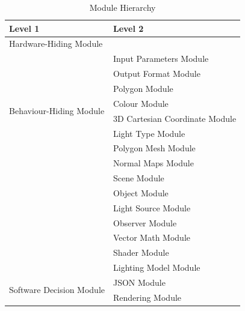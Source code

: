 \documentclass[12pt, titlepage]{article}
\begin{document}
\begin{table}[h!]
\centering
\begin{tabular}{p{} p{}}
\toprule
\textbf{Level 1} & \textbf{Level 2}\\
\midrule

{Hardware-Hiding Module} & ~ \\
\midrule

\multirow{8}{0.3\textwidth}{Behaviour-Hiding Module} & Input Parameters Module\\
& Output Format Module \\
& Polygon Module\\
& Colour Module\\
& 3D Cartesian Coordinate Module\\ %
& Light Type Module \\
& Polygon Mesh Module\\ %
& Normal Maps Module\\ %
& Scene Module\\
& Object Module\\
& Light Source Module\\
& Observer Module \\
& Vector Math Module\\ %
& Shader Module\\
& Lighting Model Module\\
\midrule
\multirow{2}{0.3\textwidth}{Software Decision Module} 
& JSON Module\\ %
& Rendering Module\\ %
\bottomrule

\end{tabular}
\caption{Module Hierarchy}
\label{TblMH}
\end{table}
\end{document}
